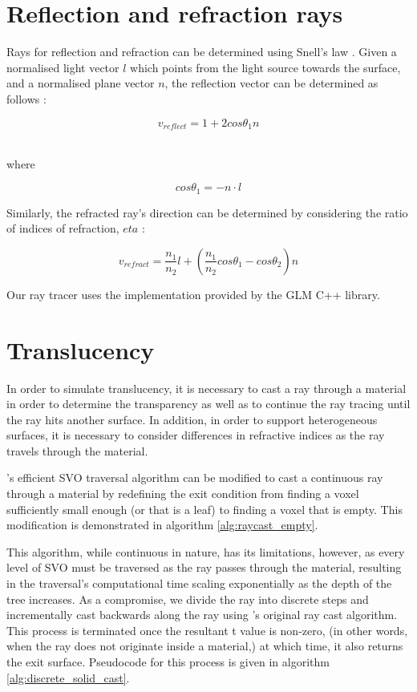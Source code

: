 \section{Reflection and refraction rays}
Rays for reflection and refraction can be determined using Snell's law \parencite{glassner89introduction}. Given a normalised light vector $l$ which points from the light source towards the surface, and a normalised plane vector $n$, the reflection vector can be determined as follows \parencite{glassner89introduction}:

\[
v_{reflect} = 1 + 2cos\theta_1n
\]
\\
\centerline{where}
\[
	cos\theta_1 = -n \cdot l
\]

Similarly, the refracted ray's direction can be determined by considering the ratio of indices of refraction, $eta$ \parencite{glassner89introduction}:

\[
	v_{refract} = \frac{n_1}{n_2}l + (\frac{n_1}{n_2}cos\theta_1 - cos\theta_2)n
\]

Our ray tracer uses the implementation provided by the GLM C++ library. 

\section{Translucency}
In order to simulate translucency, it is necessary to cast a ray through a material in order to determine the transparency as well as to continue the ray tracing until the ray hits another surface. In addition, in order to support heterogeneous surfaces, it is necessary to consider differences in refractive indices as the ray travels through the material.

\citeauthor{laine10efficientsvos}'s efficient SVO traversal algorithm can be modified to cast a continuous ray through a material by redefining the exit condition from finding a voxel sufficiently small enough (or that is a leaf) to finding a voxel that is empty. This modification is demonstrated in algorithm \ref{alg:raycast_empty}.

This algorithm, while continuous in nature, has its limitations, however, as every level of SVO must be traversed as the ray passes through the material, resulting in the traversal's computational time scaling exponentially as the depth of the tree increases. As a compromise, we divide the ray into discrete steps and incrementally cast backwards along the ray using \citeauthor{laine10efficientsvos}'s original ray cast algorithm. This process is terminated once the resultant t value is non-zero, (in other words, when the ray does not originate inside a material,) at which time, it also returns the exit surface. Pseudocode for this process is given in algorithm \ref{alg:discrete_solid_cast}.

